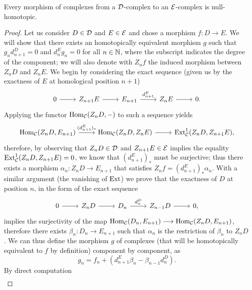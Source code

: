 \begin{proposition}
	\label{prop:dg-containment}
	Every morphism of complexes from a $\mathcal{D}$-complex to an $\mathcal{E}$-complex is null-homotopic.
\end{proposition}
\begin{proof}
	Let us consider $D\in \mathcal{D}$ and $E \in \mathcal{E}$ and chose a morphism $f\colon D \longrightarrow E$. We will show that there exists an homotopically equivalent morphism $g$ such that $g_{n} d_{n+1}^D = 0$ and $d_{n}^E g_n = 0$ for all $n \in \mathbb{N}$, where the subscript indicates the degree of the component; we will also denote with $Z_n f$ the induced morphism between $Z_n D$ and $Z_n E$. We begin by considering the exact sequence (given us by the exactness of $E$ at homological position $n+1$)
	\[\begin{tikzcd}
		0 & {Z_{n+1 }E} & {E_{n+1}} & {Z_n E} & {0.}
		\arrow[from=1-1, to=1-2]
		\arrow[from=1-2, to=1-3]
		\arrow["{d_{n+1}^E}", from=1-3, to=1-4]
		\arrow[from=1-4, to=1-5]
	\end{tikzcd}\]
	Applying the functor $\mathrm{Hom}_{\mathcal{C}}(Z_n D, {-})$ to such a sequence yields
	\[\begin{tikzcd}
		{\Hom_\C(Z_n D, E_{n+1})} & {\Hom_\C(Z_n D, Z_n E)} & {\Ext^1_\C(Z_n D, Z_{n+1 }E),}
		\arrow["{(d_{n+1}^E)_*}", from=1-1, to=1-2]
		\arrow[from=1-2, to=1-3]
	\end{tikzcd}\]
	therefore, by observing that $Z_n D \in \mathcal{D}$ and $Z_{n+1 }E \in \mathcal{E}$ implies the equality ${\mathrm{Ext}^1_{\mathcal{C}}(Z_n D, Z_{n+1 }E)} =0 $, we know that ${(d_{n+1}^E)_*}$ must be surjective; thus there exists a morphism $\alpha_n \colon Z_n D \longrightarrow E_{n+1}$ that satisfies $Z_n f = {(d_{n+1}^E)_*} \alpha_n$. With a similar argument (the vanishing of $\mathrm{Ext}$) we prove that the exactness of $D$ at position $n$, in the form of the exact sequence
	\[\begin{tikzcd}
		0 & {Z_{n }D} & {D_{n}} & {Z_{n-1} D} & {0,}
		\arrow[from=1-1, to=1-2]
		\arrow[from=1-2, to=1-3]
		\arrow["{d_{n}^D}", from=1-3, to=1-4]
		\arrow[from=1-4, to=1-5]
	\end{tikzcd}\]
	implies the surjectivity of the map $\mathrm{Hom}_{\mathcal{C}}(D_n,E_{n+1}) \longrightarrow \mathrm{Hom}_{\mathcal{C}}(Z_n D,E_{n+1}) $, therefore there exists $\beta_n \colon D_n \longrightarrow E_{n+1}$ such that $\alpha_n$ is the restriction of $\beta_n$ to $Z_n D$. We can thus define the morphism $g$ of complexes (that will be homotopically equivalent to $f$ by definition) component by component, as
	\[g_n = f_n + (d_{n+1}^E \beta_n - \beta_{n-1}d_n^D).\]
	By direct computation 
	\begin{align*}

\end{align*}
\end{proof}
